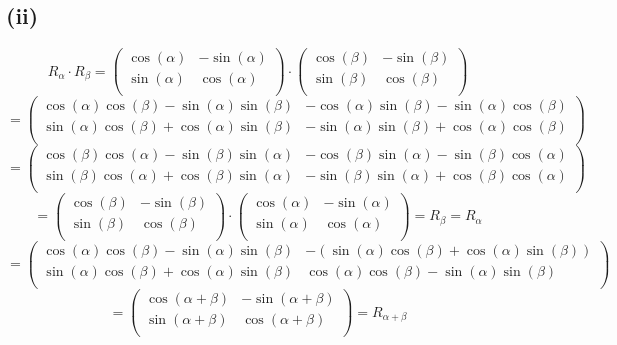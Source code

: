 \documentclass{article}
\begin{document}
\subsection{(ii)}
\[R_\alpha \cdot R_\beta = \left(\begin{matrix}
    \cos(\alpha) & -\sin(\alpha) \\
    \sin(\alpha) & \cos(\alpha) \\
\end{matrix}\right) \cdot \left(\begin{matrix}
    \cos(\beta) & -\sin(\beta) \\
    \sin(\beta) & \cos(\beta) \\
\end{matrix}\right)\]
\[= \left(\begin{matrix}
    \cos(\alpha)\cos(\beta)-\sin(\alpha)\sin(\beta) & -\cos(\alpha)\sin(\beta)-\sin(\alpha)\cos(\beta) \\
    \sin(\alpha)\cos(\beta)+\cos(\alpha)\sin(\beta) & -\sin(\alpha)\sin(\beta)+\cos(\alpha)\cos(\beta) \\
\end{matrix}\right)\]
\[= \left(\begin{matrix}
    \cos(\beta)\cos(\alpha)-\sin(\beta)\sin(\alpha) & -\cos(\beta)\sin(\alpha)-\sin(\beta)\cos(\alpha) \\
    \sin(\beta)\cos(\alpha)+\cos(\beta)\sin(\alpha) & -\sin(\beta)\sin(\alpha)+\cos(\beta)\cos(\alpha) \\
\end{matrix}\right)\]
\[=\left(\begin{matrix}
    \cos(\beta) & -\sin(\beta) \\
    \sin(\beta) & \cos(\beta) \\
\end{matrix}\right) \cdot \left(\begin{matrix}
    \cos(\alpha) & -\sin(\alpha) \\
    \sin(\alpha) & \cos(\alpha) \\
\end{matrix}\right) = R_\beta = R_\alpha\]
\[= \left(\begin{matrix}
    \cos(\alpha)\cos(\beta)-\sin(\alpha)\sin(\beta) & -(\sin(\alpha)\cos(\beta)+\cos(\alpha)\sin(\beta)) \\
    \sin(\alpha)\cos(\beta)+\cos(\alpha)\sin(\beta) & \cos(\alpha)\cos(\beta)-\sin(\alpha)\sin(\beta) \\
\end{matrix}\right)\]
\[=\left(\begin{matrix}
    \cos(\alpha + \beta) & -\sin(\alpha + \beta) \\
    \sin(\alpha + \beta) & \cos(\alpha + \beta) \\
\end{matrix}\right) = R_{\alpha + \beta}\]
\end{document}
